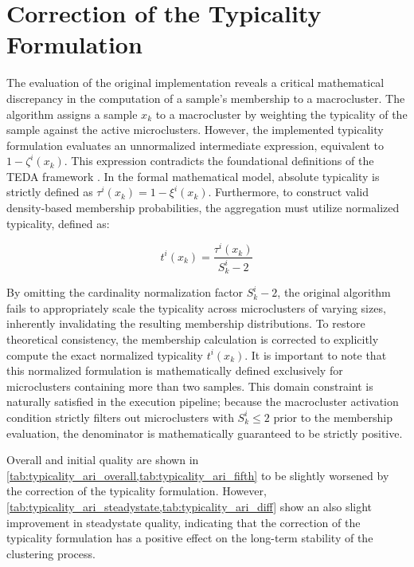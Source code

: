 \section{Correction of the Typicality Formulation}
\label{sec:correction_typicality}

The evaluation of the original implementation reveals a critical mathematical discrepancy in the computation of a sample's membership to a macrocluster. The algorithm assigns a sample $x_k$ to a macrocluster by weighting the typicality of the sample against the active microclusters. However, the implemented typicality formulation evaluates an unnormalized intermediate expression, equivalent to $1 - \zeta^i(x_k)$. This expression contradicts the foundational definitions of the TEDA framework \cite{angelov2014outside}. In the formal mathematical model, absolute typicality is strictly defined as $\tau^i(x_k) = 1 - \xi^i(x_k)$. Furthermore, to construct valid density-based membership probabilities, the aggregation must utilize normalized typicality, defined as:

\begin{equation}
    t^i(x_k) = \frac{\tau^i(x_k)}{S^i_k - 2}
\end{equation}

By omitting the cardinality normalization factor $S^i_k - 2$, the original algorithm fails to appropriately scale the typicality across microclusters of varying sizes, inherently invalidating the resulting membership distributions. To restore theoretical consistency, the membership calculation is corrected to explicitly compute the exact normalized typicality $t^i(x_k)$. It is important to note that this normalized formulation is mathematically defined exclusively for microclusters containing more than two samples. This domain constraint is naturally satisfied in the execution pipeline; because the macrocluster activation condition strictly filters out microclusters with $S^i_k \le 2$ prior to the membership evaluation, the denominator is mathematically guaranteed to be strictly positive.

Overall and initial quality are shown in \cref{tab:typicality_ari_overall,tab:typicality_ari_fifth} to be slightly worsened by the correction of the typicality formulation. However, \cref{tab:typicality_ari_steadystate,tab:typicality_ari_diff} show an also slight improvement in steadystate quality, indicating that the correction of the typicality formulation has a positive effect on the long-term stability of the clustering process.

